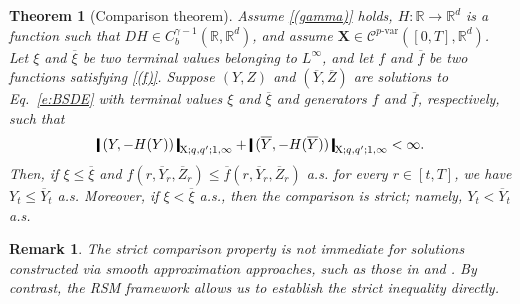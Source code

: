 \documentclass[11pt,reqno]{amsart}
\newtheorem{theorem}[lemma]{Theorem}
\newtheorem{remark}[lemma]{Remark}
\numberwithin{equation}{section}
\def\R{\mathbb R}
\newcommand{\shortthickbar}{%
  \vcenter{\hbox{\rule{1.8pt}{2.2ex}}}%
}
\newcommand{\thicknm}[1]{%
  \mathopen{\shortthickbar}%
  \mkern4mu #1 \mkern4mu%
  \mathclose{\shortthickbar}%
}
\begin{document}
\begin{theorem}[Comparison theorem]\label{thm:comparison}
Assume \ref{(gamma)} holds, $H:\R \to \R^d$ is a function such that $DH\in C^{\gamma - 1}_{b}(\R,\R^d)$, and assume $\mathbf X \in \mathscr{C}^{p\text{-}\mathrm{var}}([0,T],\R^d)$. Let $\xi$ and $\overline \xi$ be two terminal values belonging to $L^{\infty}$, and let $f$ and $\overline f$ be two functions satisfying \ref{(f)}. Suppose $(Y,Z)$ and $(\overline Y, \overline Z)$ are solutions to Eq.~\eqref{e:BSDE} with terminal values $\xi$ and $\overline \xi$ and generators $f$ and $\overline{f}$, respectively, such that 
\begin{equation*}
\thicknm{(Y,-H(Y))}_{\mathrm X;q,q';1,\infty} +\thicknm{(\overline Y,-H(\overline Y))}_{\mathrm X;q,q';1,\infty} < \infty.
\end{equation*}
Then, if $\xi \le \overline \xi$ and $f(r,\overline Y_r,\overline Z_r) \le \overline{f}(r,\overline Y_r,\overline Z_r)$ a.s. for every $r \in [t,T]$, we have $Y_{t} \le \overline Y_{t}$ a.s. 
Moreover, if $\xi < \overline \xi$ a.s., then the comparison is strict; namely, $Y_t < \overline Y_t$ a.s.   
\end{theorem}

\begin{remark}\label{rem:on strict comparison}
The strict comparison property is not immediate for solutions constructed via smooth approximation approaches, such as those in \cite[Theorem~3]{DF} and \cite[Definition~3.1]{liang2025multidimensional}. 
By contrast, the \emph{RSM} framework allows us to establish the strict inequality directly. 
\end{remark}
\end{document}
